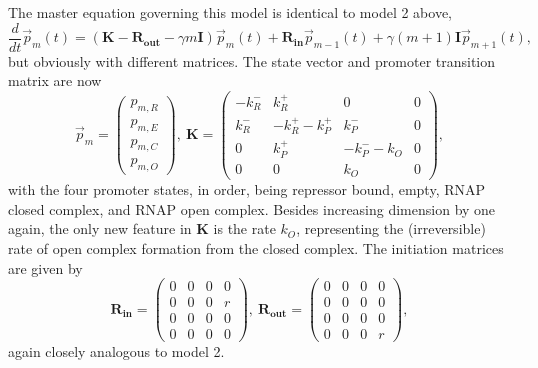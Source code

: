 \documentclass[12pt]{article}%
\newcommand{\vect}[1]{\vec{#1}}
\newcommand{\matr}[1]{\mathbf{#1}}
\newcommand{\deriv}[2][{}]{\frac{d #1}{d #2}}
\begin{document}
The master equation governing this model is identical to model 2 above,
\begin{equation}
\deriv{t}\vect{p}_m(t) =
\left( \matr{K} - \matr{R_{out}} - \gamma m \matr{I} \right) \vect{p}_m(t)
                + \matr{R_{in}} \vect{p}_{m-1}(t) +
                \gamma (m+1) \matr{I} \vect{p}_{m+1}(t),
\end{equation}
but obviously with different matrices.
The state vector and promoter transition matrix are now
\begin{equation}
\vect{p}_m = \begin{pmatrix} p_{m,R} \\ p_{m,E} \\
                             p_{m,C} \\ p_{m,O}\end{pmatrix},\
\matr{K} = \begin{pmatrix} -k_R^- & k_R^+ & 0 & 0\\
                        k_R^- & -k_R^+ -k_P^+ & k_P^- & 0 \\
                        0 & k_P^+ & -k_P^- - k_O & 0 \\
                        0 & 0 & k_O & 0
                \end{pmatrix},
\end{equation}
with the four promoter states, in order, being repressor bound,
empty, RNAP closed complex, and RNAP open complex.
Besides increasing dimension by one again, the only new feature in
$\matr{K}$ is the rate $k_O$, representing the (irreversible)
rate of open complex formation from the closed complex.
The initiation matrices are given by
\begin{equation}
\matr{R_{in}} = \begin{pmatrix}
        0 & 0 & 0 & 0 \\ 0 & 0 & 0 & r \\ 0 & 0 & 0 & 0\\ 0 & 0 & 0 & 0
                \end{pmatrix},\
\matr{R_{out}} = \begin{pmatrix}
        0 & 0 & 0 & 0 \\ 0 & 0 & 0 & 0 \\ 0 & 0 & 0 & 0\\ 0 & 0 & 0 & r
                \end{pmatrix},
\end{equation}
again closely analogous to model 2.
\end{document}
